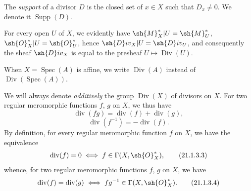 
The \emph{support} of a divisor $D$ is the closed set of $x\in X$ such that $D_x\neq 0$.
We denote it $\operatorname{Supp}(D)$.

For every open $U$ of $X$, we evidently have $\sh{M}_X^*|U=\sh{M}_U^*$, $\sh{O}_X^*|U=\sh{O}_U^*$, hence
$\sh{D}iv_X|U=\sh{D}iv_U$, and consequently the sheaf $\sh{D}iv_X$ is equal to the presheaf $U\mapsto\operatorname{Div}(U)$.

When $X=\operatorname{Spec}(A)$ is affine, we write $\operatorname{Div}(A)$ instead of $\operatorname{Div}(\operatorname{Spec}(A))$.

\begin{env}[21.1.3]
\label{IV.21.1.3}
We will always denote \emph{additively} the group $\operatorname{Div}(X)$ of divisors on $X$.
For two regular meromorphic functions $f$, $g$ on $X$, we thus have
\[
\label{IV.21.1.3.1}
  \operatorname{div}(fg)=\operatorname{div}(f)+\operatorname{div}(g),
  \tag{21.1.3.1}
\]
\[
\label{IV.21.1.3.2}
  \operatorname{div}(f^{-1})=-\operatorname{div}(f).
  \tag{21.1.3.2}
\]
By definition, for every regular meromorphic function $f$ on $X$, we have the equivalence
\[
\label{IV.21.1.3.3}
  \operatorname{div}(f)=0 \iff f\in\Gamma(X,\sh{O}_X^*),
  \tag{21.1.3.3}
\]
whence, for two regular meromorphic functions $f$, $g$ on $X$, we have
\[
\label{IV.21.1.3.4}
  \operatorname{div}(f)=\operatorname{div}(g) \iff fg^{-1}\in\Gamma(X,\sh{O}_X^*).
  \tag{21.1.3.4}
\]
\end{env}


